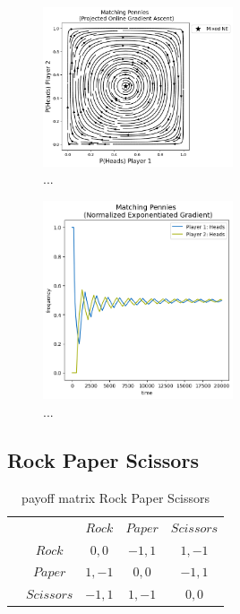 \begin{figure}
    \centering
    \includegraphics[width=0.5\textwidth]{logos/Pennies2.png}
    \caption{...}
    \label{Pennies2}
\end{figure}

\begin{figure}
    \centering
    \includegraphics[width=0.5\textwidth]{logos/Pennies3.png}
    \caption{...}
    \label{Pennies3}
\end{figure}


\subsection{Rock Paper Scissors}\label{subsection:rockPaperScissors}

\begin{table}\centering
\setlength{\extrarowheight}{2pt}
\begin{tabular}{cc|c|c|c|}
  & \multicolumn{1}{c}{} & \multicolumn{1}{c}{$Rock$}  & \multicolumn{1}{c}{$Paper$}  & \multicolumn{1}{c}{$Scissors$} \\\cline{3-5}
            & $Rock$ & $0,0$ & $-1,1$ & $1,-1$ \\ \cline{3-5}
            & $Paper$ & $1,-1$ & $0,0$ & $-1,1$ \\\cline{3-5}
            & $Scissors$ & $-1,1$ & $1,-1$ & $0,0$ \\\cline{3-5}
\end{tabular}\caption{\label{tab:payoffRPS}payoff matrix Rock Paper Scissors}
\end{table}

